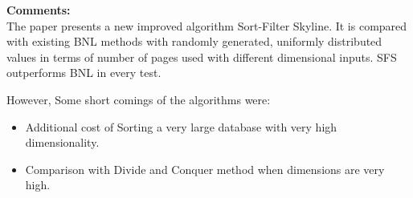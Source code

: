 \documentclass[a4paper,12pt, twoside]{article}
\begin{document}
\textbf{Comments:}\\
The paper presents a new improved algorithm Sort-Filter Skyline. It is compared with existing BNL methods with randomly generated, uniformly distributed values in terms of number of pages used with different dimensional inputs. SFS outperforms BNL in every test.  

However, Some short comings of the  algorithms were:
\begin{itemize}
	\item Additional cost of Sorting a very large database with very high dimensionality.	
	\item Comparison with Divide and Conquer method when dimensions are very high.
\end{itemize}
\end{document}
